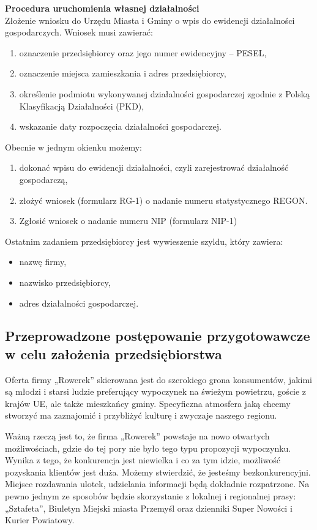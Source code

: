 \documentclass{sprawozdanie-agh}
\begin{document}
		\textbf{Procedura uruchomienia własnej działalności}\\
		Złożenie wniosku do Urzędu Miasta i Gminy o wpis do ewidencji działalności gospodarczych.
		Wniosek musi zawierać:
		\begin{enumerate}
			\item oznaczenie przedsiębiorcy oraz jego numer ewidencyjny – PESEL,
			\item oznaczenie miejsca zamieszkania i adres przedsiębiorcy,
			\item określenie podmiotu wykonywanej działalności gospodarczej zgodnie z Polską Klasyfikacją Działalności (PKD),
			\item wskazanie daty rozpoczęcia działalności gospodarczej.
		\end{enumerate}
		Obecnie w jednym okienku możemy:
		\begin{enumerate}
			\item dokonać wpisu do ewidencji działalności, czyli zarejestrować działalność gospodarczą,
			\item złożyć wniosek (formularz RG-1) o nadanie numeru statystycznego REGON.
			\item Zgłosić wniosek o nadanie numeru NIP (formularz NIP-1)
		\end{enumerate}
		Ostatnim zadaniem przedsiębiorcy jest wywieszenie szyldu, który zawiera:
		\begin{itemize}
			\item nazwę firmy,
			\item nazwisko przedsiębiorcy,
			\item adres działalności gospodarczej.
		\end{itemize}
		
		\subsection{Przeprowadzone postępowanie przygotowawcze w celu założenia przedsiębiorstwa}

		Oferta firmy „Rowerek” skierowana jest do szerokiego grona konsumentów, jakimi są młodzi i starsi ludzie preferujący wypoczynek na świeżym powietrzu, goście z krajów UE, ale także mieszkańcy gminy. Specyficzna atmosfera jaką chcemy stworzyć ma zaznajomić i przybliżyć kulturę i zwyczaje naszego regionu.
	
		Ważną rzeczą jest to, że firma „Rowerek” powstaje na nowo otwartych możliwościach, gdzie do tej pory nie było tego typu propozycji wypoczynku. Wynika z tego, że konkurencja jest niewielka i co za tym idzie, możliwość pozyskania klientów jest duża. Możemy stwierdzić, że jesteśmy bezkonkurencyjni. Miejsce rozdawania ulotek, udzielania informacji będą dokładnie rozpatrzone. Na pewno jednym ze sposobów będzie skorzystanie z lokalnej i regionalnej prasy: „Sztafeta”, Biuletyn Miejski miasta Przemyśl oraz dzienniki Super Nowości i Kurier Powiatowy.
		
\end{document}
